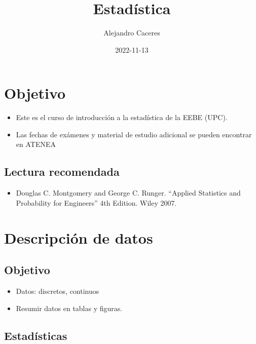 \documentclass[
]{book}
\title{Estadística}
\author{Alejandro Caceres}
\date{2022-11-13}
\providecommand{\tightlist}{%
  \setlength{\itemsep}{0pt}\setlength{\parskip}{0pt}}
\begin{document}
\maketitle

{
\setcounter{tocdepth}{1}
\tableofcontents
}
\hypertarget{objetivo}{%
\chapter{Objetivo}\label{objetivo}}

\begin{itemize}
\item
  Este es el curso de introducción a la estadística de la EEBE (UPC).
\item
  Las fechas de exámenes y material de estudio adicional se pueden encontrar en ATENEA
\end{itemize}

\hypertarget{lectura-recomendada}{%
\section{Lectura recomendada}\label{lectura-recomendada}}

\begin{itemize}
\tightlist
\item
  Douglas C. Montgomery and George C. Runger. ``Applied Statistics and Probability for Engineers'' 4th Edition. Wiley 2007.
\end{itemize}

\hypertarget{descripciuxf3n-de-datos}{%
\chapter{Descripción de datos}\label{descripciuxf3n-de-datos}}

\hypertarget{objetivo-1}{%
\section{Objetivo}\label{objetivo-1}}

\begin{itemize}
\tightlist
\item
  Datos: discretos, continuos
\item
  Resumir datos en tablas y figuras.
\end{itemize}

\hypertarget{estaduxedsticas}{%
\section{Estadísticas}\label{estaduxedsticas}}
\end{document}
